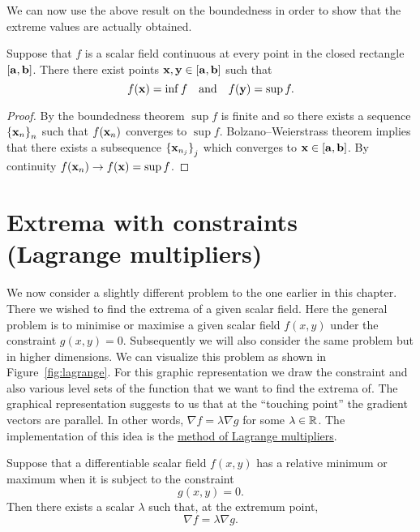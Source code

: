 We can now use the above result on the boundedness in order to show that the  extreme values are actually obtained.

\begin{theorem}
    Suppose that \(f\) is a scalar field continuous at every point in the closed rectangle \([\mathbf{a},\mathbf{b}]\).
    There there exist points \( \mathbf{x}, \mathbf{y} \in [\mathbf{a},\mathbf{b}]\) such that
    \[
        f(\mathbf{x}) = \inf f
        \quad \text{and} \quad
        f(\mathbf{y})= \sup f.
    \]
\end{theorem}

\begin{proof}
    By the boundedness theorem \(\sup f\) is finite and so there exists a sequence  \({\{\mathbf{x}_{n}\}}_{n}\)  such that \(f(\mathbf{x}_n)\) converges to \(\sup f\).
    Bolzano–Weierstrass theorem implies that there exists a subsequence  \({\{\mathbf{x}_{n_j}\}}_{j}\) which converges to \( \mathbf{x} \in [\mathbf{a},\mathbf{b}]\).
    By continuity \(f(\mathbf{x}_n) \to f(\mathbf{x}) = \sup f\).
\end{proof}




\section{Extrema with constraints (Lagrange multipliers)}

We now consider a slightly different problem to the one earlier in this chapter.
There we wished to find the extrema of a given scalar field.
Here the general problem is to minimise or maximise a given scalar field \(f(x,y)\) under the constraint \(g(x,y) = 0\).
Subsequently we will also consider the same problem but in higher dimensions.
We can visualize this problem as shown in Figure~\ref{fig:lagrange}.
For this graphic representation we draw the constraint and also various level sets of the function that we want to find the extrema of.
The graphical representation suggests to us that at the ``touching point'' the gradient vectors are parallel.
In other words, \(\nabla f = \lambda \nabla g\) for some \(\lambda \in \mathbb{R}\).
The implementation of this idea is the \href{https://en.wikipedia.org/wiki/Lagrange_multiplier}{method of Lagrange multipliers}.

\begin{theorem}
    Suppose that a differentiable scalar field \(f(x,y)\) has a relative minimum or maximum when it is subject to the constraint
    \[
        g(x,y) = 0.
    \]
    Then there exists a scalar \(\lambda\) such that, at the extremum point,
    \[
        \nabla f = \lambda \nabla g.
    \]
\end{theorem}


